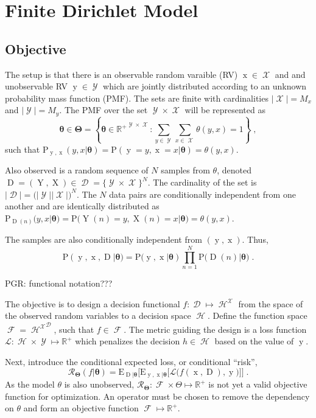 \documentclass[12pt]{report}
\DeclareMathOperator{\xrm}{\mathrm{x}}
\DeclareMathOperator{\Xrm}{\mathrm{X}}
\DeclareMathOperator{\yrm}{\mathrm{y}}
\DeclareMathOperator{\Yrm}{\mathrm{Y}}
\DeclareMathOperator{\Drm}{\mathrm{D}}
\DeclareMathOperator{\Xcal}{\mathcal{X}}
\DeclareMathOperator{\Ycal}{\mathcal{Y}}
\DeclareMathOperator{\Dcal}{\mathcal{D}}
\DeclareMathOperator{\Hcal}{\mathcal{H}}
\DeclareMathOperator{\Fcal}{\mathcal{F}}
\begin{document}
\chapter{Finite Dirichlet Model}


\section{Objective}

The setup is that there is an observable random varaible (RV) $\xrm \in \Xcal$ and and unobservable RV $\yrm \in \Ycal$ which are jointly distributed according to an unknown probability mass function (PMF). The sets are finite with cardinalities $|\Xcal| = M_x$ and $|\Ycal| = M_y$. The PMF over the set $\Ycal \times \Xcal $ will be represented as
\begin{equation}
\bm{\theta} \in \bm{\Theta} = \left\{ \bm{\theta} \in {\mathbb{R}^+}^{\Ycal \times \Xcal}: \sum_{y \in \Ycal} \sum_{x \in \Xcal}  \theta(y,x) = 1 \right\} \;,
\end{equation}
such that $\text{P}_{\yrm,\xrm}(y,x | \bm{\theta}) = \text{P}(\yrm = y, \xrm = x | \bm{\theta}) = \theta(y,x)$.

Also observed is a random sequence of $N$ samples from $\theta$, denoted $\Drm = ( \Yrm,\Xrm ) \in \Dcal = \{\Ycal \times \Xcal\}^N$. The cardinality of the set is $|\Dcal| = \big( |\Ycal| |\Xcal| \big)^N$. The $N$ data pairs are conditionally independent from one another and are identically distributed as $\text{P}_{\Drm(n)}(y,x | \bm{\theta}) = \text{P}\big( \Yrm(n) = y, \Xrm(n) = x | \bm{\theta} \big) = \theta(y,x)$. 

The samples are also conditionally independent from $(\yrm,\xrm)$. Thus,
\begin{equation}
\text{P}(\yrm,\xrm,\Drm | \bm{\theta}) = \text{P}(\yrm,\xrm | \bm{\theta}) \prod_{n=1}^N \text{P}\big( \Drm(n) | \bm{\theta} \big) \;.
\end{equation}

PGR: functional notation???

The objective is to design a decision functional $f: \Dcal \mapsto \Hcal^{\Xcal}$ from the space of the observed random variables to a decision space $\Hcal$. Define the function space $\Fcal = {\Hcal^{\Xcal}}^{\Dcal}$, such that $f \in \Fcal$. The metric guiding the design is a loss function $\mathcal{L}: \Hcal \times \Ycal \mapsto \mathbb{R}^+$ which penalizes the decision $h \in \Hcal$ based on the value of $\yrm$. 

Next, introduce the conditional expected loss, or conditional ``risk'',
\begin{equation} \label{eq:risk_cond}
\mathcal{R}_{\bm{\Theta}}(f | \bm{\theta}) = \text{E}_{\Drm | \bm{\theta}} \bigg[ \text{E}_{\yrm,\xrm | \bm{\theta}} \Big[ \mathcal{L}\big( f(\xrm,\Drm),\yrm \big) \Big] \bigg] \;.
\end{equation}
As the model $\theta$ is also unobserved, $\mathcal{R}_{\bm{\Theta}}: \Fcal \times \Theta \mapsto \mathbb{R}^+$ is not yet a valid objective function for optimization. An operator must be chosen to remove the dependency on $\theta$ and form an objective function $\Fcal \mapsto \mathbb{R}^+$.
\end{document}

